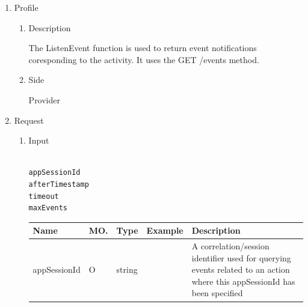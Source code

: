 \begin{enumerate}

\item Profile

\begin{enumerate}

\item Description

The ListenEvent function is used to return event notifications coresponding to the activity.  
It uses the GET /events method. 

\item Side

Provider

\end{enumerate}

\item Request

\begin{enumerate}

\item Input

\begin{tcolorbox}[boxrule=0pt, frame empty]
\begin{verbatim}

appSessionId
afterTimestamp
timeout
maxEvents

\end{verbatim}
\end{tcolorbox}





\begin{table}[H]
\footnotesize

\begin{center}
\begin{tabular}{|p{3cm}|l|p{3cm}|p{3cm}|p{4cm}|} 
\hline
\rowcolor{lightgray}	Name	& MO.	& Type	& Example & 	Description \\
\hline

appSessionId			& O	& 	string				&								& 	A correlation/session identifier used for querying events related to an action 
																						where this appSessionId has been specified	\\ 
\hline


\end{tabular}
\end{center}
\end{table}
\end{enumerate}
\end{enumerate}
